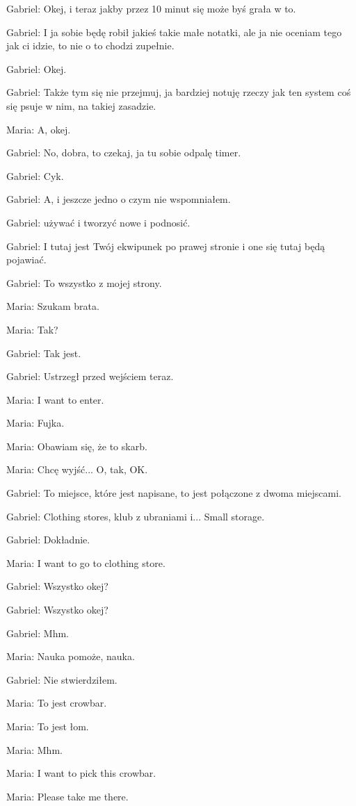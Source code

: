 Gabriel: Okej, i teraz jakby przez 10 minut się może byś grała w to.

Gabriel: I ja sobie będę robił jakieś takie małe notatki, ale ja nie oceniam tego jak ci idzie, to nie o to chodzi zupełnie.

Gabriel: Okej.

Gabriel: Także tym się nie przejmuj, ja bardziej notuję rzeczy jak ten system coś się psuje w nim, na takiej zasadzie.

Maria: A, okej.

Gabriel: No, dobra, to czekaj, ja tu sobie odpalę timer.

Gabriel: Cyk.

Gabriel: A, i jeszcze jedno o czym nie wspomniałem.

Gabriel: używać i tworzyć nowe i podnosić.

Gabriel: I tutaj jest Twój ekwipunek po prawej stronie i one się tutaj będą pojawiać.

Gabriel: To wszystko z mojej strony.

Maria: Szukam brata.

Maria: Tak?

Gabriel: Tak jest.

Gabriel: Ustrzegł przed wejściem teraz.

Maria: I want to enter.

Maria: Fujka.

Maria: Obawiam się, że to skarb.

Maria: Chcę wyjść... O, tak, OK.

Gabriel: To miejsce, które jest napisane, to jest połączone z dwoma miejscami.

Gabriel: Clothing stores, klub z ubraniami i... Small storage.

Gabriel: Dokładnie.

Maria: I want to go to clothing store.

Gabriel: Wszystko okej?

Gabriel: Wszystko okej?

Gabriel: Mhm.

Maria: Nauka pomoże, nauka.

Gabriel: Nie stwierdziłem.

Maria: To jest crowbar.

Maria: To jest łom.

Maria: Mhm.

Maria: I want to pick this crowbar.

Maria: Please take me there.

